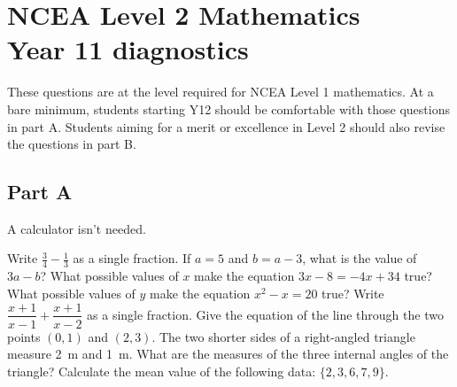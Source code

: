 


\section*{NCEA Level 2 Mathematics\\Year 11 diagnostics}
These questions are at the level required for NCEA Level 1 mathematics. At a bare minimum, students starting Y12 should be comfortable
with those questions in part A. Students aiming for a merit or excellence in Level 2 should also revise the questions in part B.

\subsection*{Part A}
A calculator isn't needed.
\begin{questions}
  \question Write $ \frac{3}{4} - \frac{1}{3} $ as a single fraction.
  \question If $ a = 5 $ and $ b = a - 3 $, what is the value of $ 3a - b $?
  \question What possible values of $ x $ make the equation $ 3x - 8 = -4x + 34 $ true?
  \question What possible values of $ y $ make the equation $ x^2 - x = 20 $ true?
  \question Write $ \dfrac{x + 1}{x - 1} + \dfrac{x + 1}{x - 2} $ as a single fraction.
  \question Give the equation of the line through the two points $ (0,1) $ and $ (2,3) $.
  \question The two shorter sides of a right-angled triangle measure \SI{2}{\metre} and \SI{1}{\metre}. What are the measures of the three internal angles of the triangle?
  \question Calculate the mean value of the following data: $\{ 2, 3, 6, 7, 9 \} $.
\end{questions}

\clearpage
